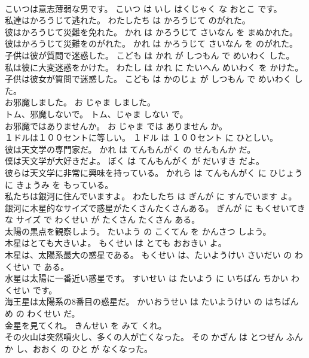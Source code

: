 \documentclass[8pt]{extreport}
\begin{document}
\begin{CJK}{UTF8}{min}
\\	こいつは意志薄弱な男です。	こいつ は いし はくじゃく な おとこ です。	
\\	私達はかろうじて逃れた。	わたしたち は かろうじて のがれた。	
\\	彼はかろうじて災難を免れた。	かれ は かろうじて さいなん を まぬかれた。	
\\	彼はかろうじて災難をのがれた。	かれ は かろうじて さいなん を のがれた。	
\\	子供は彼が質問で迷惑した。	こども は かれ が しつもん で めいわく した。	
\\	私は彼に大変迷惑をかけた。	わたし は かれ に たいへん めいわく を かけた。	
\\	子供は彼女が質問で迷惑した。	こども は かのじょ が しつもん で めいわく した。	
\\	お邪魔しました。	お じゃま しました。	
\\	トム、邪魔しないで。	トム、じゃま しない で。	
\\	お邪魔ではありませんか。	お じゃま では ありません か。	
\\	１ドルは１００セントに等しい。	１ドル は １００セント に ひとしい。	
\\	彼は天文学の専門家だ。	かれ は てんもんがく の せんもんか だ。	
\\	僕は天文学が大好きだよ。	ぼく は てんもんがく が だいすき だよ。	
\\	彼らは天文学に非常に興味を持っている。	かれら は てんもんがく に ひじょう に きょうみ を もっている。	
\\	私たちは銀河に住んでいますよ。	わたしたち は ぎんが に すんでいます よ。	
\\	銀河に木星的なサイズで惑星がたくさんたくさんある。	ぎんが に もくせいてき な サイズ で わくせい が たくさん たくさん ある。	
\\	太陽の黒点を観察しよう。	たいよう の こくてん を かんさつ しよう。	
\\	木星はとても大きいよ。	もくせい は とても おおきい よ。	
\\	木星は、太陽系最大の惑星である。	もくせい は、たいようけい さいだい の わくせい で ある。	
\\	水星は太陽に一番近い惑星です。	すいせい は たいよう に いちばん ちかい わくせい です。	
\\	海王星は太陽系の8番目の惑星だ。	かいおうせい は たいようけい の はちばんめ の わくせい だ。	
\\	金星を見てくれ。	きんせい を みて くれ。	
\\	その火山は突然噴火し、多くの人が亡くなった。	その かざん は とつぜん ふんか し、おおく の ひと が なくなった。	

\end{CJK}
\end{document}
